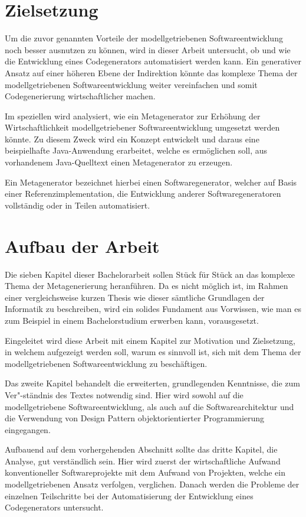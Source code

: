 \documentclass[12pt,oneside,a4paper,parskip]{scrbook}
\begin{document}
\section{Zielsetzung}

Um die zuvor genannten Vorteile der modellgetriebenen Softwareentwicklung noch besser ausnutzen zu können, wird in dieser Arbeit untersucht, ob und wie die Entwicklung eines Codegenerators automatisiert werden kann. Ein generativer Ansatz auf einer höheren Ebene der Indirektion könnte das komplexe Thema der modellgetriebenen Softwareentwicklung weiter vereinfachen und somit Codegenerierung wirtschaftlicher machen.

Im speziellen wird analysiert, wie ein Metagenerator zur Erhöhung der Wirtschaftlichkeit modellgetriebener Softwareentwicklung umgesetzt werden könnte. Zu diesem Zweck wird ein Konzept entwickelt und daraus eine beispielhafte Java-Anwendung erarbeitet, welche es ermöglichen soll, aus vorhandenem Java-Quelltext einen Metagenerator zu erzeugen.

Ein Metagenerator bezeichnet hierbei einen Softwaregenerator, welcher auf Basis einer Referenzimplementation, die Entwicklung anderer Softwaregeneratoren vollständig oder in Teilen automatisiert.

\section{Aufbau der Arbeit}

Die sieben Kapitel dieser Bachelorarbeit sollen Stück für Stück an das komplexe Thema der Metagenerierung heranführen. Da es nicht möglich ist, im Rahmen einer vergleichsweise kurzen Thesis wie dieser sämtliche Grundlagen der Informatik zu beschreiben, wird ein solides Fundament aus Vorwissen, wie man es zum Beispiel in einem Bachelorstudium erwerben kann, vorausgesetzt.

Eingeleitet wird diese Arbeit mit einem Kapitel zur Motivation und Zielsetzung, in welchem aufgezeigt werden soll, warum es sinnvoll ist, sich mit dem Thema der modellgetriebenen Softwareentwicklung zu beschäftigen.

Das zweite Kapitel behandelt die erweiterten, grundlegenden Kenntnisse, die zum Ver"-ständnis des Textes notwendig sind. Hier wird sowohl auf die modellgetriebene Softwareentwicklung, als auch auf die Softwarearchitektur und die Verwendung von Design Pattern objektorientierter Programmierung eingegangen.

Aufbauend auf dem vorhergehenden Abschnitt sollte das dritte Kapitel, die Analyse, gut verständlich sein. Hier wird zuerst der wirtschaftliche Aufwand konventioneller Softwareprojekte mit dem Aufwand von Projekten, welche ein modellgetriebenen Ansatz verfolgen, verglichen. Danach werden die Probleme der einzelnen Teilschritte bei der Automatisierung der Entwicklung eines Codegenerators untersucht.
\end{document}
